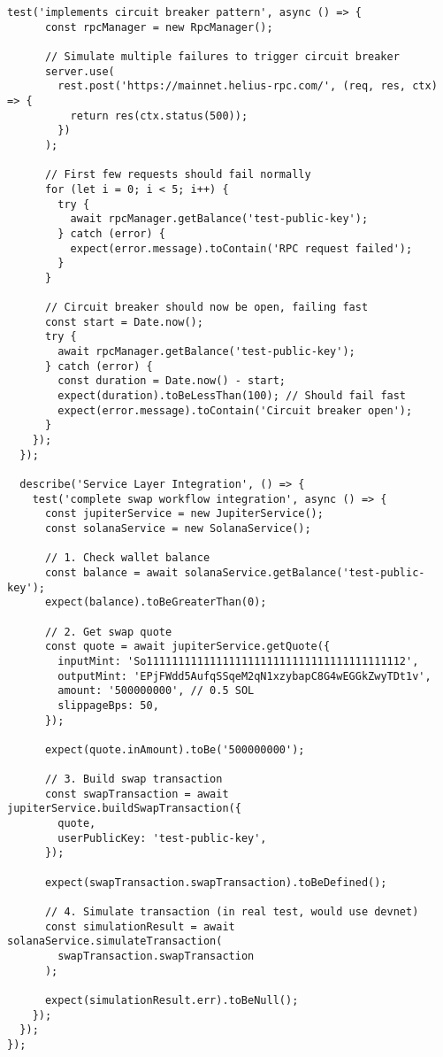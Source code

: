 \documentclass[11pt,a4paper]{article}
\begin{document}
\begin{lstlisting}[style=typescript, caption=API Integration Test Suite]
    test('implements circuit breaker pattern', async () => {
      const rpcManager = new RpcManager();

      // Simulate multiple failures to trigger circuit breaker
      server.use(
        rest.post('https://mainnet.helius-rpc.com/', (req, res, ctx) => {
          return res(ctx.status(500));
        })
      );

      // First few requests should fail normally
      for (let i = 0; i < 5; i++) {
        try {
          await rpcManager.getBalance('test-public-key');
        } catch (error) {
          expect(error.message).toContain('RPC request failed');
        }
      }

      // Circuit breaker should now be open, failing fast
      const start = Date.now();
      try {
        await rpcManager.getBalance('test-public-key');
      } catch (error) {
        const duration = Date.now() - start;
        expect(duration).toBeLessThan(100); // Should fail fast
        expect(error.message).toContain('Circuit breaker open');
      }
    });
  });

  describe('Service Layer Integration', () => {
    test('complete swap workflow integration', async () => {
      const jupiterService = new JupiterService();
      const solanaService = new SolanaService();

      // 1. Check wallet balance
      const balance = await solanaService.getBalance('test-public-key');
      expect(balance).toBeGreaterThan(0);

      // 2. Get swap quote
      const quote = await jupiterService.getQuote({
        inputMint: 'So11111111111111111111111111111111111111112',
        outputMint: 'EPjFWdd5AufqSSqeM2qN1xzybapC8G4wEGGkZwyTDt1v',
        amount: '500000000', // 0.5 SOL
        slippageBps: 50,
      });

      expect(quote.inAmount).toBe('500000000');

      // 3. Build swap transaction
      const swapTransaction = await jupiterService.buildSwapTransaction({
        quote,
        userPublicKey: 'test-public-key',
      });

      expect(swapTransaction.swapTransaction).toBeDefined();

      // 4. Simulate transaction (in real test, would use devnet)
      const simulationResult = await solanaService.simulateTransaction(
        swapTransaction.swapTransaction
      );

      expect(simulationResult.err).toBeNull();
    });
  });
});
\end{lstlisting}
\end{document}
